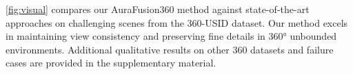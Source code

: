 
\vspace{3pt}
\cref{fig:visual} compares our AuraFusion360 method against state-of-the-art approaches on challenging scenes from the 360-USID dataset. Our method excels in maintaining view consistency and preserving fine details in 360° unbounded environments. Additional qualitative results on other 360 datasets and failure cases are provided in the supplementary material. 












